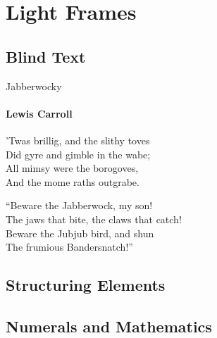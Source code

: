 \documentclass{beamer}
\begin{document}
\begin{darkframes}
  \end{darkframes}

  \section{Light Frames}
    \subsection{Blind Text}
    \begin{frame}{Jabberwocky}
      \framesubtitle{Lewis Carroll}%
      'Twas brillig, and the slithy toves\\
      Did gyre and gimble in the wabe;\\
      All mimsy were the borogoves,\\
      And the mome raths outgrabe.\\\bigskip

      “Beware the Jabberwock, my son!\\
      The jaws that bite, the claws that catch!\\
      Beware the Jubjub bird, and shun\\
      The frumious Bandersnatch!”\\
    \end{frame}
    \subsection{Structuring Elements}
    \subsection{Numerals and Mathematics}
\end{document}
